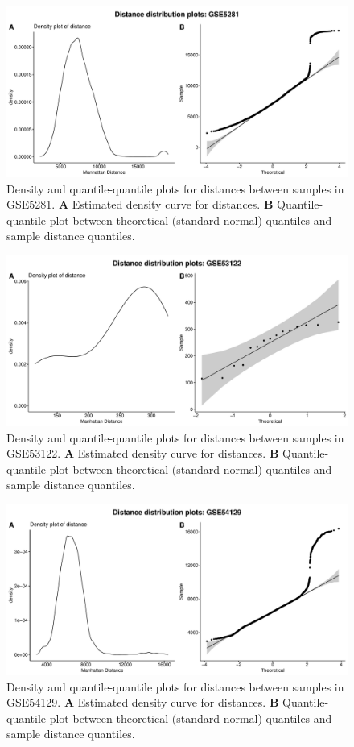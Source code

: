 \documentclass[10pt,letterpaper]{article}\usepackage[]{graphicx}\usepackage[]{color}
\begin{document}
\begin{figure}[H]
	\includegraphics[width=\textwidth]{manhattan-distance_hist_GSE5281.pdf}
	\caption{Density and quantile-quantile plots for distances between samples in GSE5281. \textbf{A} Estimated density curve for distances. \textbf{B} Quantile-quantile plot between theoretical (standard normal) quantiles and sample distance quantiles.}
\end{figure}

\begin{figure}[H]
	\includegraphics[width=\textwidth]{manhattan-distance_hist_GSE53122.pdf}
	\caption{Density and quantile-quantile plots for distances between samples in GSE53122. \textbf{A} Estimated density curve for distances. \textbf{B} Quantile-quantile plot between theoretical (standard normal) quantiles and sample distance quantiles.}
\end{figure}

\begin{figure}[H]
	\includegraphics[width=\textwidth]{manhattan-distance_hist_GSE54129.pdf}
	\caption{Density and quantile-quantile plots for distances between samples in GSE54129. \textbf{A} Estimated density curve for distances. \textbf{B} Quantile-quantile plot between theoretical (standard normal) quantiles and sample distance quantiles.}
\end{figure}
\end{document}
